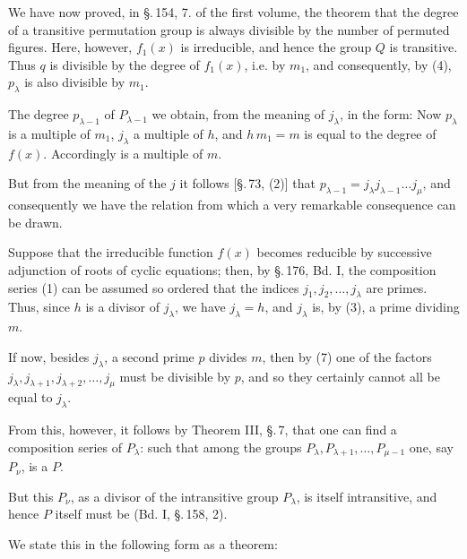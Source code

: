 We have now proved, in §.\,154, 7. of the first volume, the theorem that the degree
of a transitive permutation group is always divisible by the number of permuted
figures. Here, however, $f_1(x)$ is irreducible, and hence the group
$Q$ is transitive. Thus $q$ is divisible by the degree of $f_1(x)$, i.e. by $m_1$,
and consequently, by (4), $p_\lambda$ is also divisible by $m_1$.

The degree $p_{\lambda-1}$ of $P_{\lambda-1}$ we obtain, from the meaning of
$j_\lambda$, in the form:
Now $p_\lambda$ is a multiple of $m_1$, $j_\lambda$ a multiple of $h$,
and $h\, m_1 = m$ is equal to the degree of $f(x)$. Accordingly
is a multiple of $m$.

But from the meaning of the $j$ it follows [§.\,73, (2)] that
$p_{\lambda-1} = j_\lambda j_{\lambda-1} \ldots j_\mu$, %
and consequently we have the
relation
from which a very remarkable consequence can be drawn.

Suppose that the irreducible function $f(x)$ becomes reducible by successive adjunction
of roots of cyclic equations; then, by §.\,176, Bd. I, the composition
series (1) can be assumed so ordered that the indices
$j_1, j_2, \ldots, j_\lambda$ are primes. Thus, since $h$ is a divisor of
$j_\lambda$, we have $j_\lambda = h$, and $j_\lambda$ is, by (3), a prime
dividing $m$.

If now, besides $j_\lambda$, a second prime $p$ divides $m$, then
by (7) one of the factors $j_\lambda, j_{\lambda+1}, j_{\lambda+2}, \ldots, j_\mu$
must be divisible by $p$, and so they certainly cannot all be equal to $j_\lambda$.

From this, however, it follows by Theorem III, §.\,7, that one can find a composition series of
$P_\lambda$:
such that among the groups $P_\lambda, P_{\lambda+1}, \ldots,
P_{\mu-1}$ one, say $P_\nu$, is a  $P$.

But this $P_\nu$, as a divisor of the intransitive group $P_\lambda$, is itself
intransitive, and hence $P$ itself must be  (Bd. I, §.\,158, 2).

We state this in the following form as a theorem:

